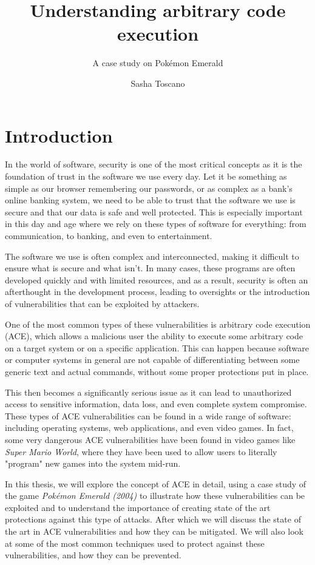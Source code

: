 \documentclass[a4paper]{usiinfbachelorproject}
\author{Sasha Toscano}
\title{\textbf{Understanding arbitrary code
execution}}
\subtitle{A case study on Pokémon Emerald}
\begin{document}
\maketitle
\tableofcontents\newpage

\section{\textbf{Introduction}}
In the world of software, security is one of the most critical concepts as it is the foundation of trust in the software we use every day. Let it be something as simple as our browser remembering our passwords, or as complex as a bank's online banking system, we need to be able to trust that the software we use is secure and that our data is safe and well protected. This is especially important in this day and age where we rely on these types of software for everything: from communication, to banking, and even to entertainment.

The software we use is often complex and interconnected, making it difficult to ensure what is secure and what isn't. In many cases, these programs are often developed quickly and with limited resources, and as a result, security is often an afterthought in the development process, leading to oversights or the introduction of vulnerabilities that can be exploited by attackers.

One of the most common types of these vulnerabilities is arbitrary code execution (ACE), which allows a malicious user the ability to execute some arbitrary code on a target system or on a specific application. This can happen because software or computer systems in general are not capable of differentiating between some generic text and actual commands, without some proper protections put in place.

This then becomes a significantly serious issue as it can lead to unauthorized access to sensitive information, data loss, and even complete system compromise. These types of ACE vulnerabilities can be found in a wide range of software: including operating systems, web applications, and even video games. In fact, some very dangerous ACE vulnerabilities have been found in video games like \textit{Super Mario World}, where they have been used to allow users to literally "program" new games into the system mid-run.

In this thesis, we will explore the concept of ACE in detail, using a case study of the game \textit{Pokémon Emerald (2004)} to illustrate how these vulnerabilities can be exploited and to understand the importance of creating state of the art protections against this type of attacks. After which we will discuss the state of the art in ACE vulnerabilities and how they can be mitigated. We will also look at some of the most common techniques used to protect against these vulnerabilities, and how they can be prevented.
\end{document}
